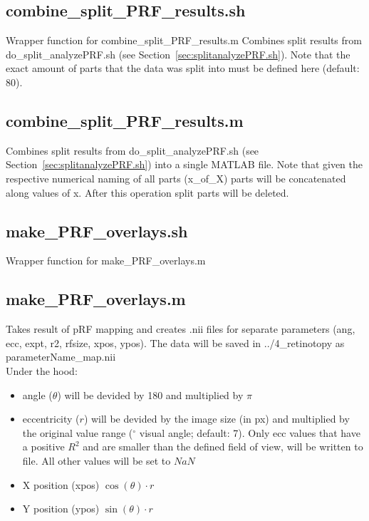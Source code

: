 \documentclass[12pt,a4paper]{scrartcl}
\begin{document}
\subsection{combine\_split\_PRF\_results.sh}
\label{sec:combsplt}
Wrapper function for combine\_split\_PRF\_results.m Combines split results from do\_split\_analyzePRF.sh (see Section~\ref{sec:splitanalyzePRF.sh}). Note that the exact amount of parts that the data was split into must be defined here (default: 80).\\

\subsection{combine\_split\_PRF\_results.m}
Combines split results from do\_split\_analyzePRF.sh (see Section~\ref{sec:splitanalyzePRF.sh}) into a single MATLAB file. Note that given the respective numerical naming of all parts (x\_of\_X) parts will be concatenated along values of x. After this operation split parts will be deleted.

\subsection{make\_PRF\_overlays.sh}
\label{sec:mkprfO}
Wrapper function for make\_PRF\_overlays.m

\subsection{make\_PRF\_overlays.m}
Takes result of pRF mapping and creates .nii files for separate parameters (ang, ecc, expt, r2, rfsize, xpos, ypos). The data will be saved in ../4\_retinotopy as parameterName\_map.nii\\

\noindent Under the hood:
\begin{itemize}
\item angle ($\theta$) will be devided by 180 and multiplied by $\pi$
\item eccentricity ($r$) will be devided by the image size (in px) and multiplied by the original value range ($^\circ$ visual angle; default: 7). Only ecc values that have a positive $R^2$ and are smaller than the defined field of view, will be written to file. All other values will be set to $NaN$
\item X position (xpos) $\cos(\theta)\cdotp r$
\item Y position (ypos) $\sin(\theta)\cdotp r$
\end{itemize}
\end{document}
